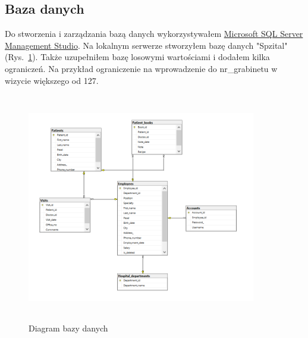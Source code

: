 \begin{flushleft}
    \subsection{\Large{Baza danych}}
    \hspace{5mm}Do stworzenia i zarządzania bazą danych wykorzystywałem {\color{blue}\href{https://en.wikipedia.org/wiki/SQL_Server_Management_Studio}{Microsoft SQL Server Management Studio}}. Na lokalnym serwerze stworzyłem bazę danych "Spzital" (Rys.~\ref{fig:db_diag}). Także uzupełniłem bazę losowymi wartościami i dodałem kilka ograniczeń. Na przykład ograniczenie na wprowadzenie do nr\_grabinetu w wizycie większego od 127.
    \begin{figure}[H]
	\begin{center}
	\includegraphics[width=10cm, height=10cm]{images/db_diagram.png}
        \caption{Diagram bazy danych}
        \label{fig:db_diag}
	\end{center}
    \end{figure}
    

\end{flushleft}
